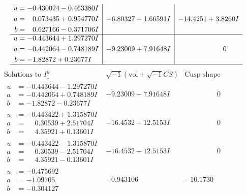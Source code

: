 \documentclass[1p]{elsarticle_modified}
\theoremstyle{definition}
\newcommand{\I}{\sqrt{-1}}
\begin{document}
$$\begin{array}{c|c|c}
\begin{aligned}
u &= -0.430024 - 0.463380 I \\
a &= \phantom{-}0.073435 + 0.954770 I \\
b &= \phantom{-}0.627166 - 0.371706 I\end{aligned}
 & -6.80327 - 1.66591 I & -14.4251 + 3.8260 I \\ \hline\begin{aligned}
u &= -0.443644 + 1.297270 I \\
a &= -0.442064 - 0.748189 I \\
b &= -1.82872 + 0.23677 I\end{aligned}
 & -9.23009 + 7.91648 I & \phantom{-0.000000 } 0\\
 \hline 
 \end{array}$$\newpage$$\begin{array}{c|c|c}  
\text{Solutions to }I^u_{1}& \I (\text{vol} + \sqrt{-1}CS) & \text{Cusp shape}\\
 \hline 
\begin{aligned}
u &= -0.443644 - 1.297270 I \\
a &= -0.442064 + 0.748189 I \\
b &= -1.82872 - 0.23677 I\end{aligned}
 & -9.23009 - 7.91648 I & \phantom{-0.000000 } 0 \\ \hline\begin{aligned}
u &= -0.443422 + 1.315870 I \\
a &= \phantom{-}0.30539 + 2.51704 I \\
b &= \phantom{-}4.35921 + 0.13601 I\end{aligned}
 & -16.4532 + 12.5153 I & \phantom{-0.000000 } 0 \\ \hline\begin{aligned}
u &= -0.443422 - 1.315870 I \\
a &= \phantom{-}0.30539 - 2.51704 I \\
b &= \phantom{-}4.35921 - 0.13601 I\end{aligned}
 & -16.4532 - 12.5153 I & \phantom{-0.000000 } 0 \\ \hline\begin{aligned}
u &= -0.475692\phantom{ +0.000000I} \\
a &= -1.09705\phantom{ +0.000000I} \\
b &= -0.304127\phantom{ +0.000000I}\end{aligned}
 & -0.943106\phantom{ +0.000000I} & -10.1730\phantom{ +0.000000I} \\ \hline\begin{aligned}

\end{aligned}
\end{array}$$
\end{document}
